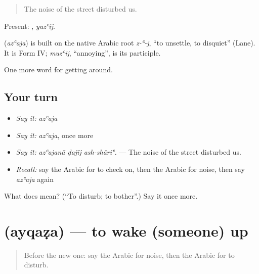 \begin{quote}
The noise of the street disturbed us.
\end{quote}

Present: , \emph{yuzʿij}.

\begin{cousinweb}
\textbf{} (\emph{azʿaja}) is built on the native Arabic root \emph{z-ʿ-j}, \textquotedblleft{}to unsettle, to disquiet\textquotedblright{} (Lane). It is Form IV; \emph{muzʿij}, \textquotedblleft{}annoying\textquotedblright{}, is its participle.
\end{cousinweb}

\begin{grammarlens}[title={What you've built}]
One more word for getting around.
\end{grammarlens}

\subsection*{Your turn}
\begin{itemize}
\raggedright
  \item \emph{Say it:} \emph{azʿaja}
  \item \emph{Say it:} \emph{azʿaja}, once more
  \item \emph{Say it:} \emph{azʿajanā ḍajīj ash-shāriʿ.} — The noise of the street disturbed us.
  \item \emph{Recall:} say the Arabic for to check on, then the Arabic for noise, then say \emph{azʿaja} again
\end{itemize}

\begin{tcolorbox}[breakable,colback=teal!4,colframe=teal!35!black,title={Before you move on}]
What does  mean? (\textquotedblleft{}To disturb; to bother\textquotedblright{}.) Say it once more.
\end{tcolorbox}
\section[\texorpdfstring{\ar{أيقظ} (ayqaẓa)}{أيقظ (ayqaẓa)}]{ (ayqaẓa) — to wake (someone) up}

\label{lesson:AR-C448-ayqaza}



\begin{quote}
Before the new one: say the Arabic for noise, then the Arabic for to disturb.
\end{quote}

